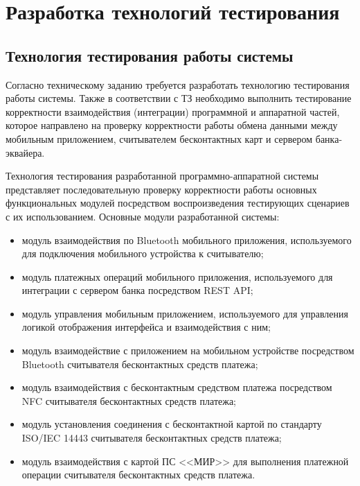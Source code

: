 \newpage

\section{Разработка технологий тестирования}
\label{sec:technolog}

\subsection{Технология тестирования работы системы}

Согласно техническому заданию требуется разработать технологию тестирования работы системы.
Также в соответствии с ТЗ необходимо выполнить тестирование корректности взаимодействия (интеграции) программной и аппаратной частей, которое направлено на проверку корректности работы обмена данными между мобильным приложением, считывателем бесконтактных карт и сервером банка-эквайера.

Технология тестирования разработанной программно-аппаратной системы представляет последовательную проверку корректности работы основных функциональных модулей посредством воспроизведения тестирующих сценариев с их использованием.
Основные модули разработанной системы:

\begin{itemize}
	\item модуль взаимодействия по Bluetooth мобильного приложения, используемого для подключения мобильного устройства к считывателю;
	\item модуль платежных операций мобильного приложения, используемого для интеграции с сервером банка посредством REST API;
	\item модуль управления мобильным приложением, используемого для управления логикой отображения интерфейса и взаимодействия с ним;
	\item модуль взаимодействие с приложением на мобильном устройстве посредством Bluetooth считывателя бесконтактных средств платежа;
	\item модуль взаимодействия с бесконтактным средством платежа посредством NFC считывателя бесконтактных средств платежа;
	\item модуль установления соединения с бесконтактной картой по стандарту ISO/IEC 14443 считывателя бесконтактных средств платежа;
	\item модуль взаимодействия с картой ПС <<МИР>> для выполнения платежной операции считывателя бесконтактных средств платежа.
\end{itemize}


